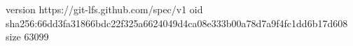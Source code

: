 version https://git-lfs.github.com/spec/v1
oid sha256:66dd3fa31866bdc22f325a6624049d4ca08e333b00a78d7a9f4fc1dd6b17d608
size 63099
